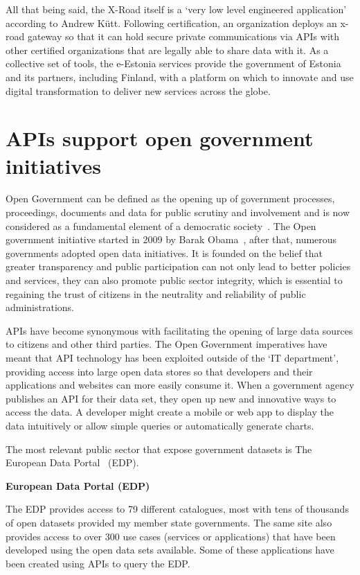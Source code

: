 All that being said, the X-Road itself is a ‘very low level engineered application’
according to Andrew Kütt. Following certification, an organization deploys an x-road gateway
so that it can hold secure private communications via APIs with other certified
organizations that are legally able to share data with it. As a collective set 
of tools, the e-Estonia services provide the government of Estonia and its partners,
including Finland, with a platform on which to innovate and use digital
transformation to deliver new services across the globe.

\section{APIs support open government initiatives}

Open Government can be defined as the opening up of government processes,
proceedings, documents and data for public scrutiny and involvement and is
now considered as a fundamental element of a democratic society~\citep{open_gov}.
The Open government initiative started in 2009 by Barak Obama~\citep{whitehouse_archives}, after that,
numerous governments adopted open data initiatives. It is founded on the
belief that greater transparency and public participation can not only lead
to better policies and services, they can also promote public sector
integrity, which is essential to regaining the trust of citizens in the
neutrality and reliability of public administrations.

APIs have become synonymous with facilitating the opening of large data sources
to citizens and other third parties. The Open Government imperatives have meant
that API technology has been exploited outside of the ‘IT department’,
providing access into large open data stores so that developers and their
applications and websites can more easily consume it. When a government agency
publishes an API for their data set, they open up new and innovative ways to
access the data. A developer might create a mobile or web app to display the
data intuitively or allow simple queries or automatically generate charts.

The most relevant public sector that expose government datasets is The European
Data Portal~\citep{edp_use_cases} (EDP).

\textbf{European Data Portal (EDP)}

The EDP provides access to 79 different catalogues, most with tens of thousands of
open datasets provided my member state governments. The same site also provides
access to over 300 use cases (services or applications) that have been developed
using the open data sets available. Some of these applications have been created
using APIs to query the EDP.

